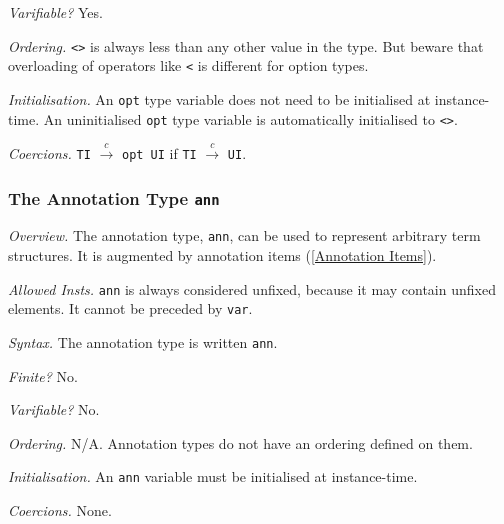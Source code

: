 \documentclass[10pt]{scrartcl}
\newcommand{\TyThing}[1]{\vspace{1.2mm}\noindent\emph{#1} }
\newcommand{\TyOverview}{\TyThing{Overview.}}
\newcommand{\TyInsts}{\TyThing{Allowed Insts.}}
\newcommand{\TySyntax}{\TyThing{Syntax.}}
\newcommand{\TyFiniteType}{\TyThing{Finite?}}
\newcommand{\TyVarifiable}{\TyThing{Varifiable?}}
\newcommand{\TyOrdering}{\TyThing{Ordering.}}
\newcommand{\TyInit}{\TyThing{Initialisation.}}
\newcommand{\TyCoercions}{\TyThing{Coercions.}}
\newcommand{\coerce}[2]{#1 $\stackrel{c}{\rightarrow}$ #2}
\begin{document}
\TyVarifiable
Yes.

\TyOrdering
\texttt{<>} is always less than any other value in the type.
But beware that overloading of operators like \texttt{<} is different for
option types.

\TyInit
An \texttt{opt} type variable does not need to be initialised at instance-time. An uninitialised \texttt{opt} type variable is automatically
initialised to \texttt{<>}.

\TyCoercions
\coerce{\texttt{TI}}{\texttt{opt UI}} if \coerce{\texttt{TI}}{\texttt{UI}}.

\subsubsection{The Annotation Type \texttt{ann}}
     \label{the annotation type}
\TyOverview
The annotation type, \texttt{ann}, can be used to represent arbitrary term
structures.  It is augmented by annotation items (\ref{Annotation Items}).

\TyInsts
\texttt{ann} is always considered unfixed, because it may contain unfixed
elements.  It cannot be preceded by \texttt{var}.

\TySyntax
The annotation type is written \texttt{ann}.

\TyFiniteType
No.

\TyVarifiable
No.

\TyOrdering
N/A.  Annotation types do not have an ordering defined on them.

\TyInit
An \texttt{ann} variable must be initialised at instance-time.

\TyCoercions
None.
\end{document}
